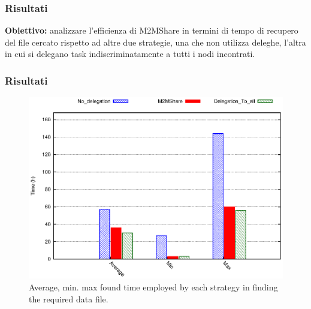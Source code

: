 \documentclass{beamer}
\begin{document}
\begin{frame}
\frametitle{Risultati}
\textbf{Obiettivo:} analizzare l'efficienza di M2MShare in termini di tempo di recupero del file cercato rispetto ad altre due strategie, una che non utilizza deleghe, l'altra in cui si delegano task indiscriminatamente a tutti i nodi incontrati.
\end{frame}

\begin{frame}
\frametitle{Risultati}
\begin{center}
\begin{figure}[ht]
\includegraphics[scale=0.7]{../grafici/tempi.eps}
\caption{Average, min. max found time employed by each strategy in finding the required data file.}
\end{figure}
\end{center}
\end{frame}
\end{document}
